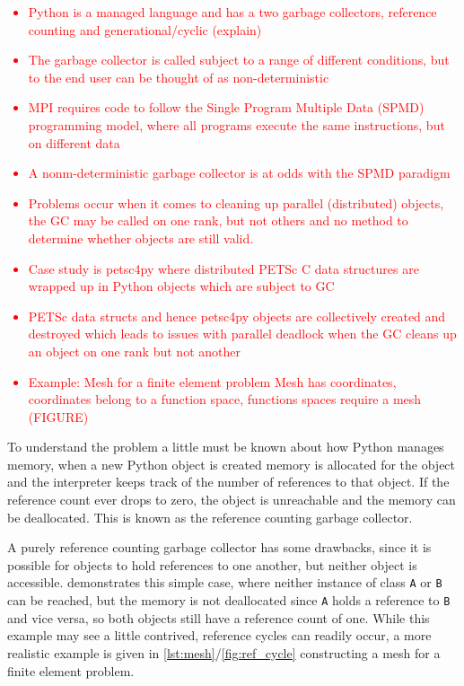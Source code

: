\documentclass[10pt,journal,compsoc]{IEEEtran}
\newcommand{\jacknotes}[1]{\textcolor{red}{#1}}
\begin{document}
\jacknotes{
\begin{itemize}
	\item Python is a managed language and has a two garbage collectors, reference counting and generational/cyclic (explain)
	\item The garbage collector is called subject to a range of different conditions, but to the end user can be thought of as non-deterministic
	\item MPI requires code to follow the Single Program Multiple Data (SPMD) programming model, where all programs execute the same instructions, but on different data
	\item A nonm-deterministic garbage collector is at odds with the SPMD paradigm
	\item Problems occur when it comes to cleaning up parallel (distributed) objects, the GC may be called on one rank, but not others and no method to determine whether objects are still valid.
	\item Case study is petsc4py where distributed PETSc C data structures are wrapped up in Python objects which are subject to GC
	\item PETSc data structs and hence petsc4py objects are collectively created and destroyed which leads to issues with parallel deadlock when the GC cleans up an object on one rank but not another
	\item Example: Mesh for a finite element problem Mesh has coordinates, coordinates belong to a function space, functions spaces require a mesh (FIGURE) 
\end{itemize}
}

To understand the problem a little must be known about how Python manages memory, when a new Python object is created memory is allocated for the object and the interpreter keeps track of the number of references to that object. If the reference count ever drops to zero, the object is unreachable and the memory can be deallocated. This is known as the reference counting garbage collector.

A purely reference counting garbage collector has some drawbacks, since it is possible for objects to hold references to one another, but neither object is accessible.  demonstrates this simple case, where neither instance of class \verb`A` or \verb`B` can be reached, but the memory is not deallocated since \verb`A` holds a reference to \verb`B` and vice versa, so both objects still have a reference count of one. While this example may see a little contrived, reference cycles can readily occur, a more realistic example is given in \cref{lst:mesh}/\cref{fig:ref_cycle} constructing a mesh for a finite element problem.
\end{document}
